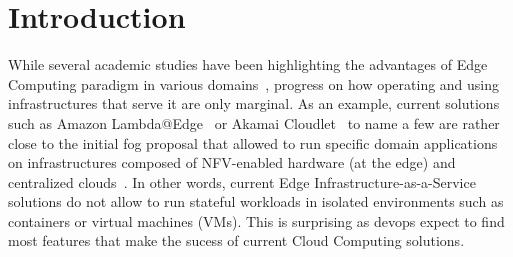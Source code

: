 \section{Introduction}
\label{sec:intro}



While several academic studies have been highlighting the advantages
of Edge Computing paradigm in various
domains~\cite{bonomi2012fog,zhang2015cloud,yi2015fog,shi2016edge,satyanarayanan2017emergence},
progress on how operating and using infrastructures that serve it are
only marginal.  As an example, current solutions such as Amazon
Lambda@Edge~\cite{amazon:lambda-edge} or Akamai
Cloudlet~\cite{akamai:cloudlets} to name a few are rather close to the
initial fog proposal that allowed to run specific domain applications
on infrastructures composed of NFV-enabled hardware (at the edge) and
centralized clouds~\cite{bonomi2012fog}.  In other words, current Edge
Infrastructure-as-a-Service solutions do not allow to run stateful
workloads in isolated environments such as containers or virtual
machines (VMs).
%
This is surprising as devops expect to find most features that make the sucess of
current Cloud Computing solutions.




